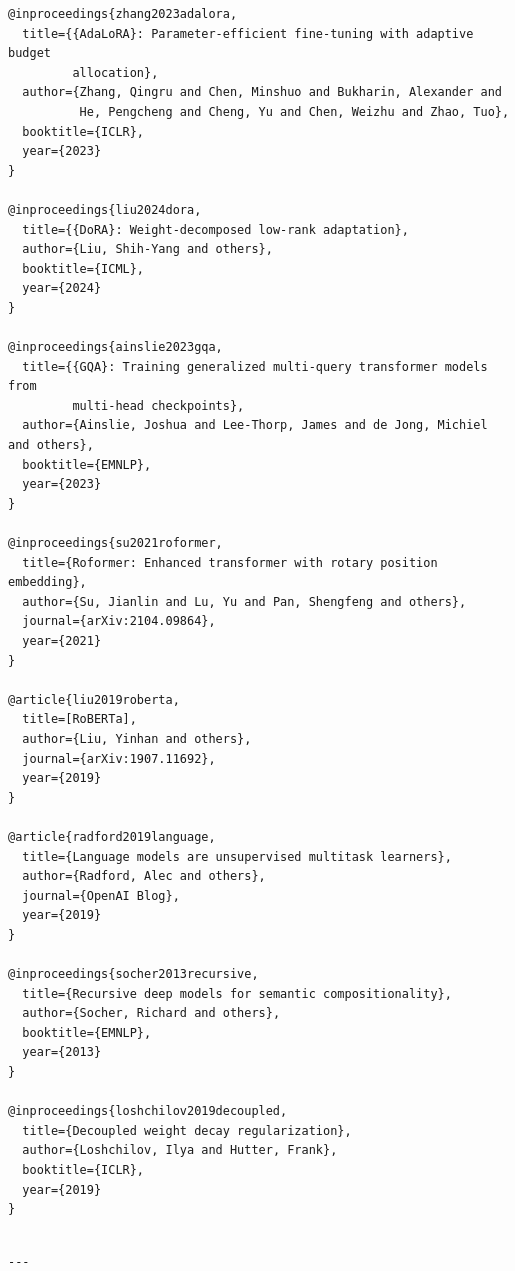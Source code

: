 \begin{lstlisting}
@inproceedings{zhang2023adalora,
  title={{AdaLoRA}: Parameter-efficient fine-tuning with adaptive budget 
         allocation},
  author={Zhang, Qingru and Chen, Minshuo and Bukharin, Alexander and 
          He, Pengcheng and Cheng, Yu and Chen, Weizhu and Zhao, Tuo},
  booktitle={ICLR},
  year={2023}
}

@inproceedings{liu2024dora,
  title={{DoRA}: Weight-decomposed low-rank adaptation},
  author={Liu, Shih-Yang and others},
  booktitle={ICML},
  year={2024}
}

@inproceedings{ainslie2023gqa,
  title={{GQA}: Training generalized multi-query transformer models from 
         multi-head checkpoints},
  author={Ainslie, Joshua and Lee-Thorp, James and de Jong, Michiel and others},
  booktitle={EMNLP},
  year={2023}
}

@inproceedings{su2021roformer,
  title={Roformer: Enhanced transformer with rotary position embedding},
  author={Su, Jianlin and Lu, Yu and Pan, Shengfeng and others},
  journal={arXiv:2104.09864},
  year={2021}
}

@article{liu2019roberta,
  title=[RoBERTa],
  author={Liu, Yinhan and others},
  journal={arXiv:1907.11692},
  year={2019}
}

@article{radford2019language,
  title={Language models are unsupervised multitask learners},
  author={Radford, Alec and others},
  journal={OpenAI Blog},
  year={2019}
}

@inproceedings{socher2013recursive,
  title={Recursive deep models for semantic compositionality},
  author={Socher, Richard and others},
  booktitle={EMNLP},
  year={2013}
}

@inproceedings{loshchilov2019decoupled,
  title={Decoupled weight decay regularization},
  author={Loshchilov, Ilya and Hutter, Frank},
  booktitle={ICLR},
  year={2019}
}
\end{lstlisting}
\begin{lstlisting}

---
\end{lstlisting}